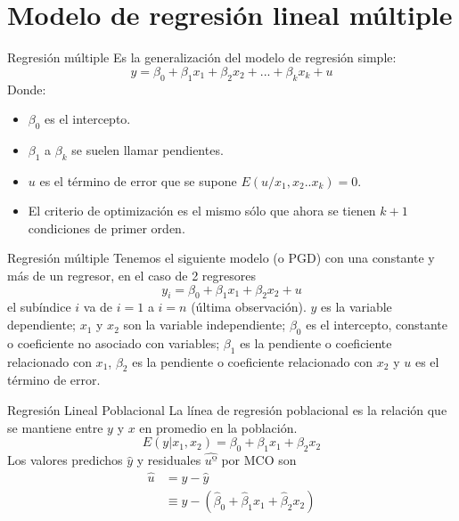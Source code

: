 \section[MRLM]{Modelo de regresión lineal múltiple}
\begin{frame}{Regresión múltiple}
	Es la generalización del modelo de regresión simple:
	$$y=\beta_{0}+\beta_{1}x_{1}+\beta_{2}x_{2}+...+\beta_{k}x_{k}+u$$
	Donde:
	\begin{itemize}
		\item $\beta_{0}$ es el intercepto.
		\item $\beta_{1}$ a $\beta_{k}$ se suelen llamar pendientes.
		\item $u$ es el término de error que se supone $E(u/x_{1},x_{2}..x_{k})=0$.
		\item El criterio de optimización es el mismo sólo que ahora se tienen $k+1$ condiciones de primer orden.
	\end{itemize}
\end{frame}
\begin{frame}{Regresión múltiple}
	Tenemos el siguiente modelo (o PGD) con una constante y más de un regresor, en el caso de 2 regresores
	$$y_i = \beta_{0} + \beta_{1}x_{1}+\beta_{2}x_{2}+u$$
	el subíndice $i$ va de $i = 1$ a $i = n$ (última observación). $y$
	es la variable dependiente; $x_1$ y $x_2$ son la variable independiente; $\beta_{0}$ es el intercepto, constante o coeficiente no asociado con variables; $\beta_{1}$ es la pendiente o coeficiente relacionado con $x_{1}$, $\beta_{2}$ es la pendiente o coeficiente relacionado con $x_{2}$ y $u$ es el término de error.
\end{frame}
\begin{frame}{Regresión Lineal Poblacional}
	La línea de regresión poblacional es la relación que se mantiene entre $y$ y $x$ en promedio en la población.
	$$E(y|x_{1}, x_{2}) = \beta_{0}+\beta_{1}x_1+\beta_{2}x_2$$
	Los valores predichos $\widehat{y}$ y residuales $\widehat{uº}$ por MCO son
	\begin{align*}
		\hat{u} & = y - \hat{y}\\
				& \equiv y - (\hat{\beta}_{0}+\hat{\beta}_{1}x_{1}+\hat{\beta}_{2}x_{2})
	\end{align*}
\end{frame}
